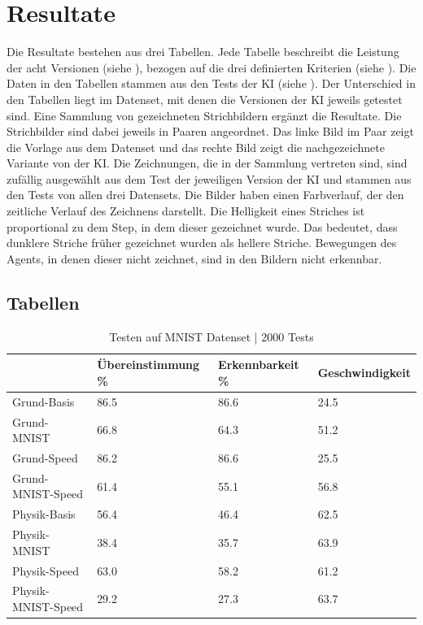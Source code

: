 \chapter{Resultate}
\label{chap:r}
Die Resultate bestehen aus drei Tabellen. Jede Tabelle beschreibt die Leistung
der acht Versionen (siehe ), bezogen auf die drei
definierten Kriterien (siehe ). Die Daten in den Tabellen
stammen aus den Tests der KI (siehe ). Der Unterschied
in den Tabellen liegt im Datenset, mit denen die Versionen der KI jeweils
getestet sind. Eine Sammlung von gezeichneten Strichbildern ergänzt die
Resultate. Die Strichbilder sind dabei jeweils in Paaren angeordnet. Das linke
Bild im Paar zeigt die Vorlage aus dem Datenset und das rechte Bild zeigt die
nachgezeichnete Variante von der KI. Die Zeichnungen, die in der Sammlung
vertreten sind, sind zufällig ausgewählt aus dem Test der jeweiligen Version der
KI und stammen aus den Tests von allen drei Datensets. Die Bilder haben einen
Farbverlauf, der den zeitliche Verlauf des Zeichnens darstellt. Die Helligkeit
eines Striches ist proportional zu dem Step, in dem dieser gezeichnet wurde. Das
bedeutet, dass dunklere Striche früher gezeichnet wurden als hellere Striche.
Bewegungen des Agents, in denen dieser nicht zeichnet, sind in den Bildern nicht
erkennbar.

\newpage
\section{Tabellen}
\label{chap:r_tab}
\begin{table}[!ht]
    \centering
    \caption{Testen auf MNIST Datenset | 2000 Tests}
    \begin{tabular}{|l|l|l|l|}
        \hline
            ~ & Übereinstimmung \% & Erkennbarkeit \% & Geschwindigkeit \\ \hline
            Grund-Basis & 86.5 & 86.6 & 24.5 \\ \hline
            Grund-MNIST & 66.8 & 64.3 & 51.2 \\ \hline
            Grund-Speed & 86.2 & 86.6 & 25.5 \\ \hline
            Grund-MNIST-Speed & 61.4 & 55.1 & 56.8 \\ \hline
            Physik-Basis & 56.4 & 46.4 & 62.5 \\ \hline
            Physik-MNIST & 38.4 & 35.7 & 63.9 \\ \hline
            Physik-Speed & 63.0 & 58.2 & 61.2 \\ \hline
            Physik-MNIST-Speed & 29.2 & 27.3 & 63.7 \\ \hline
        \end{tabular}
    \label{tab:MNIST}
\end{table}

